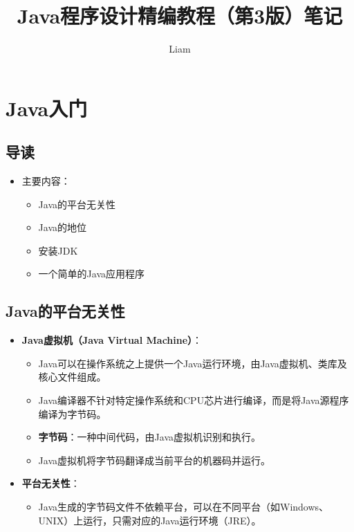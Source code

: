 \documentclass[a4paper, 10pt]{ctexart}
\begin{document}
\title{Java程序设计精编教程（第3版）笔记}
\author{Liam}
\date{}

\maketitle

\section{Java入门}

\subsection{导读}
\begin{itemize}
  \item 主要内容：
  \begin{itemize}
    \item Java的平台无关性
    \item Java的地位
    \item 安装JDK
    \item 一个简单的Java应用程序
  \end{itemize}
\end{itemize}

\subsection{Java的平台无关性}
\begin{itemize}
  \item \textbf{Java虚拟机（Java Virtual Machine）}：
  \begin{itemize}
    \item Java可以在操作系统之上提供一个Java运行环境，由Java虚拟机、类库及核心文件组成。
    \item Java编译器不针对特定操作系统和CPU芯片进行编译，而是将Java源程序编译为字节码。
    \item \textbf{字节码}：一种中间代码，由Java虚拟机识别和执行。
    \item Java虚拟机将字节码翻译成当前平台的机器码并运行。
  \end{itemize}
  \item \textbf{平台无关性}：
  \begin{itemize}
    \item Java生成的字节码文件不依赖平台，可以在不同平台（如Windows、UNIX）上运行，只需对应的Java运行环境（JRE）。
  \end{itemize}
\end{itemize}
\end{document}
